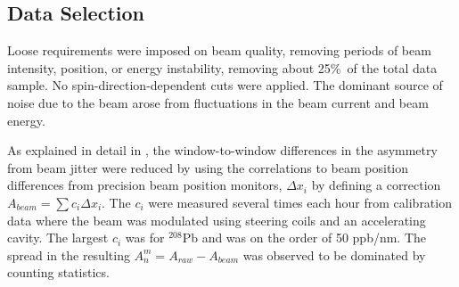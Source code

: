 
\subsection{Data Selection}\label{sec:ana_selection}

Loose requirements were imposed on beam quality,
removing periods of beam intensity, position, or energy
instability, removing about 25\%\ of the total data sample. 
No spin-direction-dependent cuts were applied.
The dominant source of noise due to the beam arose
from fluctuations in the beam current and beam energy.

As explained in detail in \cite{Acha:2006my,Aniol:2005zf,PREX},
the window-to-window differences in the asymmetry from beam jitter were reduced 
by using the correlations to beam position differences from precision
beam position monitors, $\Delta x_i$ by defining a correction $A_{beam} = \sum c_i\Delta x_i$.
The $c_i$ were measured several times each hour
from calibration data where the beam was modulated
using steering coils and an accelerating cavity.
The largest $c_i$ was for 
${}^{208}$Pb and was on the order of 50 ppb/nm.
The spread in the resulting $A_n^{m}=A_{raw}-A_{beam}$ was 
 observed to be dominated by counting statistics.
